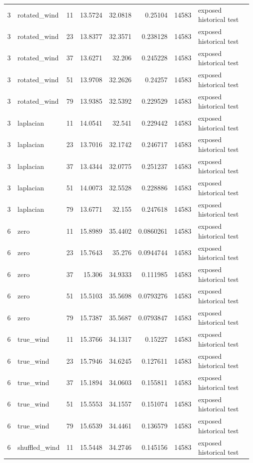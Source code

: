 \begin{tabular}{rllrrrrl}
3 & rotated\_wind & 11 & 13.5724 & 32.0818 & 0.25104 & 14583 & exposed historical test \\
3 & rotated\_wind & 23 & 13.8377 & 32.3571 & 0.238128 & 14583 & exposed historical test \\
3 & rotated\_wind & 37 & 13.6271 & 32.206 & 0.245228 & 14583 & exposed historical test \\
3 & rotated\_wind & 51 & 13.9708 & 32.2626 & 0.24257 & 14583 & exposed historical test \\
3 & rotated\_wind & 79 & 13.9385 & 32.5392 & 0.229529 & 14583 & exposed historical test \\
3 & laplacian & 11 & 14.0541 & 32.541 & 0.229442 & 14583 & exposed historical test \\
3 & laplacian & 23 & 13.7016 & 32.1742 & 0.246717 & 14583 & exposed historical test \\
3 & laplacian & 37 & 13.4344 & 32.0775 & 0.251237 & 14583 & exposed historical test \\
3 & laplacian & 51 & 14.0073 & 32.5528 & 0.228886 & 14583 & exposed historical test \\
3 & laplacian & 79 & 13.6771 & 32.155 & 0.247618 & 14583 & exposed historical test \\
6 & zero & 11 & 15.8989 & 35.4402 & 0.0860261 & 14583 & exposed historical test \\
6 & zero & 23 & 15.7643 & 35.276 & 0.0944744 & 14583 & exposed historical test \\
6 & zero & 37 & 15.306 & 34.9333 & 0.111985 & 14583 & exposed historical test \\
6 & zero & 51 & 15.5103 & 35.5698 & 0.0793276 & 14583 & exposed historical test \\
6 & zero & 79 & 15.7387 & 35.5687 & 0.0793847 & 14583 & exposed historical test \\
6 & true\_wind & 11 & 15.3766 & 34.1317 & 0.15227 & 14583 & exposed historical test \\
6 & true\_wind & 23 & 15.7946 & 34.6245 & 0.127611 & 14583 & exposed historical test \\
6 & true\_wind & 37 & 15.1894 & 34.0603 & 0.155811 & 14583 & exposed historical test \\
6 & true\_wind & 51 & 15.5553 & 34.1557 & 0.151074 & 14583 & exposed historical test \\
6 & true\_wind & 79 & 15.6539 & 34.4461 & 0.136579 & 14583 & exposed historical test \\
6 & shuffled\_wind & 11 & 15.5448 & 34.2746 & 0.145156 & 14583 & exposed historical test \\

\end{tabular}

